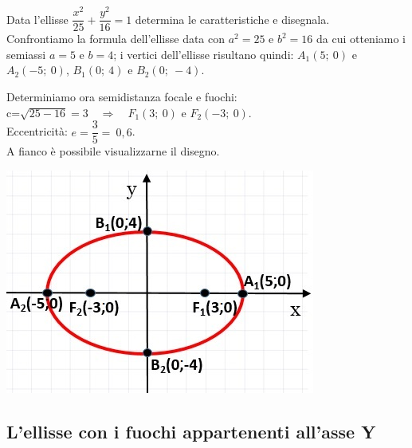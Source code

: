 \begin{esempio}
Data l'ellisse \(\dfrac{x^{2}}{25}+ 
\dfrac{y^{2}}{16}=1 \) determina le caratteristiche e disegnala.\\[7pt]
Confrontiamo la formula dell'ellisse data con \( a^{2} =25\) e 
\( b^{2} =16\) da cui otteniamo i semiassi \(a=5\) e \(b=4\); i vertici 
dell'ellisse 
risultano quindi:
\( A_{1} (5;~0)\) e \( A_{2} (-5;~0)\),  \( B_{1} (0;~4)\) e \( B_{2} 
(0;~-4)\). \\[7pt]
\begin{minipage}{.59\textwidth}
Determiniamo ora semidistanza focale e fuochi:\\[6pt] c=\( \sqrt{25-16} =3 
\quad\Rightarrow \quad F_{1} (3;~0)\) e 
\( F_{2} (-3;~0)\). \\[5pt] Eccentricità: \quad \( e= \dfrac{3}{5} 
=~0,6\).\\[6pt]
A fianco è possibile visualizzarne il disegno.
\end{minipage}
\hfill
\begin{minipage}{.39\textwidth}
     \begin{inaccessibleblock}
\includegraphics[width=\textwidth]{img/esempio1.jpg}
\end{inaccessibleblock}
\end{minipage}
\end{esempio}

\subsection{L'ellisse con i fuochi appartenenti all'asse Y}
\label{subsec:ellisse_fuochiy}

